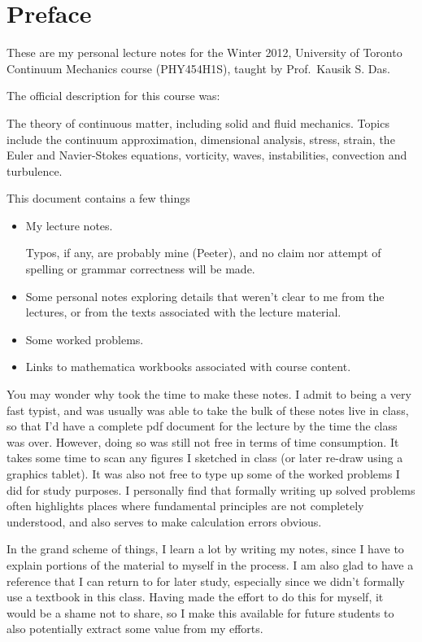 \chapter*{Preface}\normalsize

These are my personal lecture notes for the Winter 2012, University of Toronto Continuum Mechanics course (PHY454H1S), taught by Prof.\ Kausik S. Das.

The official description for this course was:

The theory of continuous matter, including solid and fluid mechanics.  Topics include the continuum approximation, dimensional analysis, stress, strain, the Euler and Navier-Stokes equations, vorticity, waves, instabilities, convection and turbulence.

This document contains a few things

\begin{itemize}
\item My lecture notes.

Typos, if any, are probably mine (Peeter), and no claim nor attempt of spelling or grammar correctness will be made.

\item Some personal notes exploring details that weren't clear to me from the lectures, or from the texts associated with the lecture material.

\item Some worked problems.

\item Links to mathematica workbooks associated with course content.

\end{itemize}

You may wonder why took the time to make these notes.  I admit to being a very fast typist, and was usually was able to take the bulk of these notes live in class, so that I'd have a complete pdf document for the lecture by the time the class was over.  However, doing so was still not free in terms of time consumption.  It takes some time to scan any figures I sketched in class (or later re-draw using a graphics tablet).  It was also not free to type up some of the worked problems I did for study purposes.  I personally find that formally writing up solved problems often highlights places where fundamental principles are not completely understood, and also serves to make calculation errors obvious.

In the grand scheme of things, I learn a lot by writing my notes, since I have to explain portions of the material to myself in the process.  I am also glad to have a reference that I can return to for later study, especially since we didn't formally use a textbook in this class.  Having made the effort to do this for myself, it would be a shame not to share, so I make this available for future students to also potentially extract some value from my efforts.

